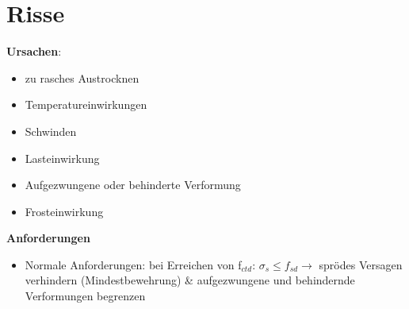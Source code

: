 \begin{minipage}{0.5\linewidth}

\section{Risse}


	\textbf{Ursachen}:
	\begin{itemize}
		\item zu rasches Austrocknen
		\item Temperatureinwirkungen
		\item Schwinden
		\item Lasteinwirkung
		\item Aufgezwungene oder behinderte Verformung
		\item Frosteinwirkung
		
	\end{itemize}

	\textbf{Anforderungen}
\begin{itemize}
	\item Normale Anforderungen: bei Erreichen von f$_{ctd}$: $ \sigma_s \leq f_{sd} \rightarrow $  sprödes Versagen verhindern (Mindestbewehrung) \& aufgezwungene und behindernde Verformungen begrenzen
	
%	
	
\end{itemize}

\end{minipage}
